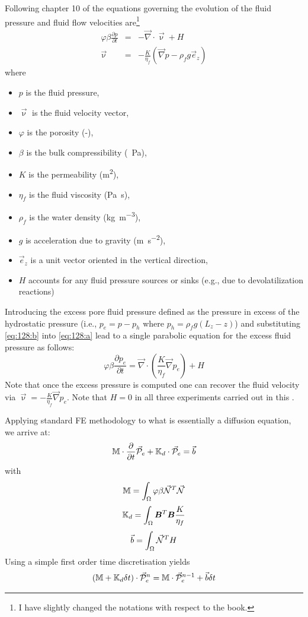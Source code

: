 Following chapter 10 of  the equations
governing the evolution of the fluid pressure and fluid flow 
velocities are\footnote{I have slightly changed the notations with respect to the book.}
\begin{eqnarray}
\varphi \beta \frac{\partial p}{\partial t} &=& -\vec\nabla \cdot \vec \upnu + H \label{eq:128:a}\\
\vec\upnu &=& -\frac{K}{\eta_f} \left(\vec\nabla p - \rho_f g \vec{e}_z \right) \label{eq:128:b}
\end{eqnarray}
where
\begin{itemize}
\item $p$ is the fluid pressure, 
\item $\vec\upnu$ is the fluid velocity vector, 
\item $\varphi$ is the porosity (-), 
\item $\beta$ is the bulk compressibility (\si{\per\pascal}), 
\item $K$ is the permeability (\si{\square\meter}), 
\item $\eta_f$ is the fluid viscosity (\si{\pascal\second}), 
\item $\rho_f$ is the water density (\si{\kg\per\cubic\meter}), 
\item $g$ is acceleration due to gravity (\si{\meter\per\square\second}), 
\item $\vec{e}_z$ is a unit vector oriented in the vertical direction, 
\item $H$ accounts for any fluid pressure sources or sinks (e.g., due to devolatilization reactions)
\end{itemize}
Introducing the excess pore fluid pressure defined as the pressure in excess of the hydrostatic pressure 
(i.e., $p_e = p-p_h$ where $p_h = \rho_f g (L_z-z)$) and 
substituting \eqref{eq:128:b} into \eqref{eq:128:a} lead to a single parabolic equation for
the excess fluid pressure as follows:
\begin{equation}
\varphi \beta  \frac{\partial p_e}{\partial t}
=
\vec\nabla \cdot \left( \frac{K}{\eta_f} \vec\nabla p_e  \right) + H
\end{equation}
Note that once the excess pressure is computed one can recover the fluid velocity via 
$\vec\upnu=-\frac{K}{\eta_f} \vec\nabla p_e$. 
Note that $H=0$ in all three experiments carried out in this \stone.

Applying standard FE methodology to what is essentially a diffusion equation, we arrive at:
\[
{{\mathbb{M}}} \cdot \frac{\partial}{\partial t} \vec{\cal P}_e + {{\mathbb{K}}}_d \cdot \vec{\cal P}_e = \vec{b}
\]
with
\[
{{\mathbb{M}}} = \int_\Omega \varphi \beta \vec{{\mathcal{N}}}^T \vec{{\mathcal{N}}} 
\]
\[
{\mathbb{K}}_d = \int_\Omega {\bm B}^T {\bm B} \frac{K}{\eta_f} 
\]
\[
\vec{b} = \int_\Omega \vec{{\mathcal{N}}}^T  H 
\]
Using a simple first order time discretisation yields
\[
({{\mathbb{M}}} + {{\mathbb{K}}}_d \delta t) \cdot \vec{\cal P}_e^n = {\mathbb{M}} \cdot \vec{\cal P}_e^{n-1} + \vec{b} \delta t
\]



